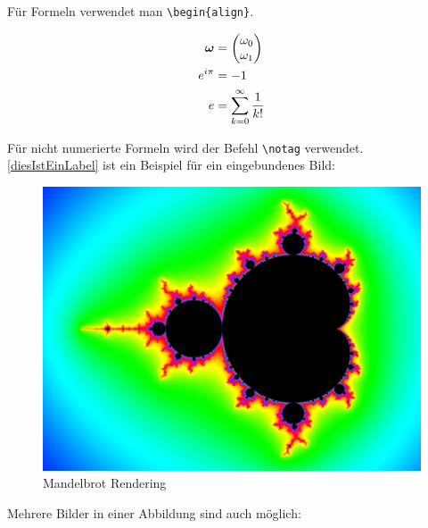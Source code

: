 Für Formeln verwendet man \lstinline|\begin{align}|.

\begin{align}
	\boldsymbol{\omega} &= \begin{pmatrix} \omega_0 \\ \omega_1 \end{pmatrix} \notag \\
	e^{i \pi} &= -1 \\
	e &= \sum_{k=0}^{\infty}\frac{1}{k!}
\end{align}

Für nicht numerierte Formeln wird der Befehl \lstinline|\notag| verwendet.
\\
\autoref{diesIstEinLabel} ist ein Beispiel für ein eingebundenes Bild:

\begin{figure}[H] %
	\centering
	\includegraphics[width=.8\linewidth]{Bilder/mandelbrot}
	\caption{Mandelbrot Rendering}
	\label{diesIstEinLabel} %
\end{figure}



Mehrere Bilder in einer Abbildung sind auch möglich:

